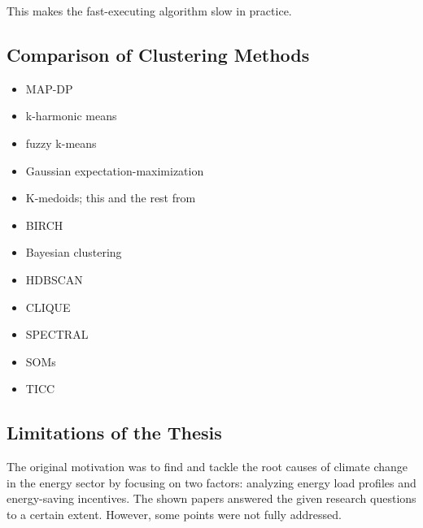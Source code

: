 \begin{description}
    This makes the fast-executing algorithm slow in practice.
\end{description}
\subsection{Comparison of Clustering Methods}
\begin{itemize}
    \item MAP-DP \cite{HAM-ALT}
    \item k-harmonic means \cite{RAY-ALT}
    \item fuzzy k-means \cite{RAY-ALT}
    \item Gaussian expectation-maximization \cite{RAY-ALT}
    \item K-medoids; this and the rest from \cite{COL-ALT}
    \item BIRCH
    \item Bayesian clustering
    \item HDBSCAN
    \item CLIQUE
    \item SPECTRAL
    \item SOMs
    \item TICC
\end{itemize}

\subsection{Limitations of the Thesis}
The original motivation was to find and tackle the root causes of climate change in the energy sector by focusing on two factors: analyzing energy load profiles and energy-saving incentives.
The shown papers answered the given research questions to a certain extent.
However, some points were not fully addressed.

